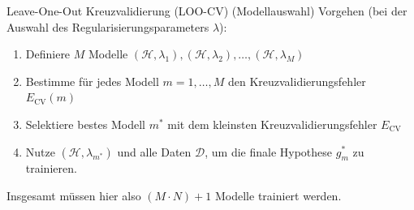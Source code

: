 \begin{defi}{Leave-One-Out Kreuzvalidierung (LOO-CV) (Modellauswahl)}
    Vorgehen (bei der Auswahl des Regularisierungsparameters $\lambda$):
    \begin{enumerate}
        \item Definiere $M$ Modelle $(\mathcal{H}, \lambda_1), (\mathcal{H}, \lambda_2), \ldots, (\mathcal{H}, \lambda_M)$
        \item Bestimme für jedes Modell $m = 1, \ldots, M$ den Kreuzvalidierungsfehler $E_\text{CV}(m)$
        \item Selektiere bestes Modell $m^*$ mit dem kleinsten Kreuzvalidierungsfehler $E_\text{CV}$
        \item Nutze $(\mathcal{H}, \lambda_{m^*})$ und alle Daten $\mathcal{D}$, um die finale Hypothese $g_m^*$ zu trainieren.
    \end{enumerate}

    Insgesamt müssen hier also $(M \cdot N) + 1$ Modelle trainiert werden.
\end{defi}